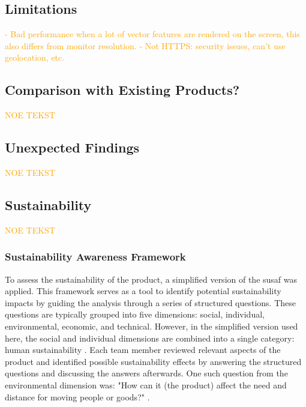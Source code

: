 \subsection{Limitations}


\textcolor{orange}{- Bad performance when a lot of vector features are rendered on the screen, this also differs from monitor resolution. - Not HTTPS: security issues, can't use geolocation, etc.}

\subsection{Comparison with Existing Products?}

\textcolor{orange}{NOE TEKST}

\subsection{Unexpected Findings} %

\textcolor{orange}{NOE TEKST}

\subsection{Sustainability} %

\textcolor{orange}{NOE TEKST}

\subsubsection{Sustainability Awareness Framework}

To assess the sustainability of the product, a simplified version of the \acrfull{susaf} was applied. This framework serves as a tool to identify potential sustainability impacts by guiding the analysis through a series of structured questions. These questions are typically grouped into five dimensions: social, individual, environmental, economic, and technical. However, in the simplified version used here, the social and individual dimensions are combined into a single category: human sustainability \cite{ntnususaf}. Each team member reviewed relevant aspects of the product and identified possible sustainability effects by answering the structured questions and discussing the answers afterwards. One such question from the environmental dimension was: "How can it (the product) affect the need and distance for moving people or goods?" \cite{susosusaf}.

